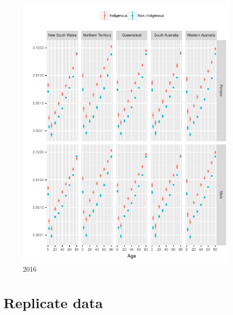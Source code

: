 \documentclass{article}
\begin{document}
\begin{figure}
  \centering
  \includegraphics{out/fig_rates_modelled_2016_Baseline}
  \caption{2016}
\end{figure}
\newpage

\clearpage
\section{Replicate data}
\newpage
\end{document}
